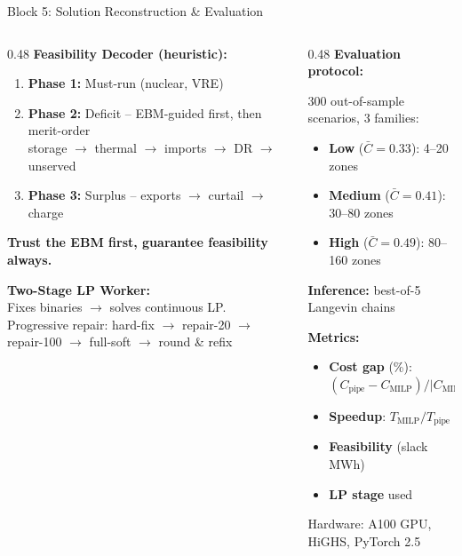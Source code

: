 \documentclass[aspectratio=169, 10pt]{beamer}
\newcommand{\highlight}[1]{\textcolor{powOrange}{\textbf{#1}}}
\newcommand{\applink}[2]{\hyperlink{#1}{\beamergotobutton{\tiny #2}}}
\begin{document}
\begin{frame}{Block 5: Solution Reconstruction \& Evaluation}
\hypertarget{main:recon}{}
\begin{columns}[T]
\begin{column}{0.48\textwidth}
\textbf{Feasibility Decoder (heuristic):}
\begin{enumerate}
  \item \textbf{Phase 1:} Must-run (nuclear, VRE)
  \item \textbf{Phase 2:} Deficit -- EBM-guided first, then merit-order\\
  {\scriptsize storage $\to$ thermal $\to$ imports $\to$ DR $\to$ unserved}
  \item \textbf{Phase 3:} Surplus -- exports $\to$ curtail $\to$ charge
\end{enumerate}
\vspace{0.2em}
\highlight{Trust the EBM first, guarantee feasibility always.}
\vspace{0.3em}

\textbf{Two-Stage LP Worker:}\\
{\small Fixes binaries $\to$ solves continuous LP.\\
Progressive repair: hard-fix $\to$ repair-20 $\to$ repair-100 $\to$ full-soft $\to$ round \& refix}
\end{column}
\begin{column}{0.48\textwidth}
\textbf{Evaluation protocol:}
\vspace{0.2em}

300 out-of-sample scenarios, 3 families:
\begin{itemize}
  \item \textbf{Low} ($\bar{C}=0.33$): 4--20 zones
  \item \textbf{Medium} ($\bar{C}=0.41$): 30--80 zones
  \item \textbf{High} ($\bar{C}=0.49$): 80--160 zones
\end{itemize}
\vspace{0.2em}
\textbf{Inference:} best-of-5 Langevin chains
\vspace{0.2em}

\textbf{Metrics:}
\begin{itemize}
  \item \textbf{Cost gap} (\%): $(C_\text{pipe} - C_\text{MILP}) / |C_\text{MILP}|$
  \item \textbf{Speedup}: $T_\text{MILP} / T_\text{pipe}$
  \item \textbf{Feasibility} (slack MWh)
  \item \textbf{LP stage} used
\end{itemize}
{\scriptsize Hardware: A100 GPU, HiGHS, PyTorch 2.5}
\end{column}
\end{columns}
\vspace{0.1em}
\applink{app:G}{App.~G: LP stages}
\end{frame}
\end{document}
